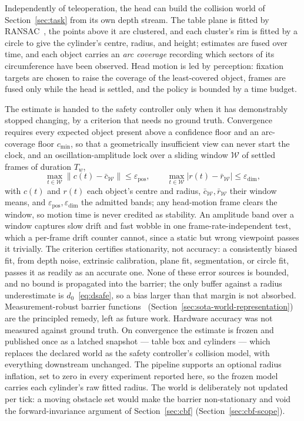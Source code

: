 \documentclass[12pt,a4paper,twoside,openright]{report}
\begin{document}
Independently of teleoperation, the head can build the collision world of Section~\ref{sec:task} from its own depth stream. The table plane is fitted by RANSAC~\cite{fischler1981ransac}, the points above it are clustered, and each cluster's rim is fitted by a circle to give the cylinder's centre, radius, and height; estimates are fused over time, and each object carries an \emph{arc coverage} recording which sectors of its circumference have been observed. Head motion is led by perception: fixation targets are chosen to raise the coverage of the least-covered object, frames are fused only while the head is settled, and the policy is bounded by a time budget.

The estimate is handed to the safety controller only when it has demonstrably stopped changing, by a criterion that needs no ground truth. Convergence requires every expected object present above a confidence floor and an arc-coverage floor $c_{\min}$, so that a geometrically insufficient view can never start the clock, and an oscillation-amplitude lock over a sliding window $\mathcal{W}$ of settled frames of duration $T_w$,
\begin{equation}
\max_{t \in \mathcal{W}} \bigl\|c(t) - \bar{c}_{\mathcal{W}}\bigr\| \le \varepsilon_{\text{pos}},
\qquad
\max_{t \in \mathcal{W}} \bigl|r(t) - \bar{r}_{\mathcal{W}}\bigr| \le \varepsilon_{\text{dim}},
\label{eq:amplock}
\end{equation}
with $c(t)$ and $r(t)$ each object's centre and radius, $\bar{c}_{\mathcal{W}}, \bar{r}_{\mathcal{W}}$ their window means, and $\varepsilon_{\text{pos}}, \varepsilon_{\text{dim}}$ the admitted bands; any head-motion frame clears the window, so motion time is never credited as stability. An amplitude band over a window captures slow drift and fast wobble in one frame-rate-independent test, which a per-frame drift counter cannot, since a static but wrong viewpoint passes it trivially. The criterion certifies stationarity, not accuracy: a consistently biased fit, from depth noise, extrinsic calibration, plane fit, segmentation, or circle fit, passes it as readily as an accurate one. None of these error sources is bounded, and no bound is propagated into the barrier; the only buffer against a radius underestimate is $d_0$~\eqref{eq:dsafe}, so a bias larger than that margin is not absorbed. Measurement-robust barrier functions~\cite{cosner2021mrcbf} (Section~\ref{sec:sota-world-representation}) are the principled remedy, left as future work. Hardware accuracy was not measured against ground truth. On convergence the estimate is frozen and published once as a latched snapshot --- table box and cylinders --- which replaces the declared world as the safety controller's collision model, with everything downstream unchanged. The pipeline supports an optional radius inflation, set to zero in every experiment reported here, so the frozen model carries each cylinder's raw fitted radius. The world is deliberately not updated per tick: a moving obstacle set would make the barrier non-stationary and void the forward-invariance argument of Section~\ref{sec:cbf} (Section~\ref{sec:cbf-scope}).
\end{document}
